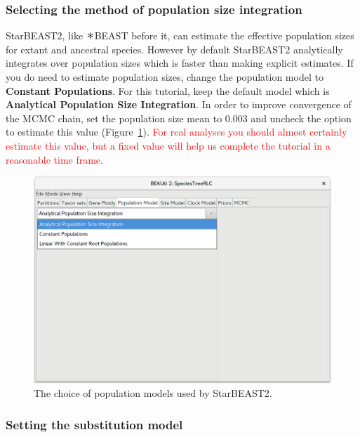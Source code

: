 \documentclass{article}
\newcommand{\Conv}{\mathop{\scalebox{1.5}{$\ast$}}}
\begin{document}
\clearpage

\subsubsection*{Selecting the method of population size integration}

StarBEAST2, like $\Conv$BEAST before it, can estimate the effective population
sizes for extant and ancestral species. However by default StarBEAST2
analytically integrates over population sizes which is faster than making
explicit estimates. If you do need to estimate population sizes, change the
population model to \textbf{Constant Populations}. For this tutorial, keep the
default model which is \textbf{Analytical Population Size Integration}. In order to improve
convergence of the MCMC chain, set the population size mean to 0.003 and uncheck
the option to estimate this value (Figure~\ref{fig:pop}). \textcolor{red}{For
real analyses you should almost certainly estimate this value, but a fixed value
will help us complete the tutorial in a reasonable time frame.}

\begin{figure}[htb!]
\centering
\includegraphics[width=\textwidth]{figures/beauti-pop-model.png}
\caption{The choice of population models used by StarBEAST2.}
\label{fig:pop}
\end{figure}

\clearpage

\subsubsection*{Setting the substitution model}
\end{document}
